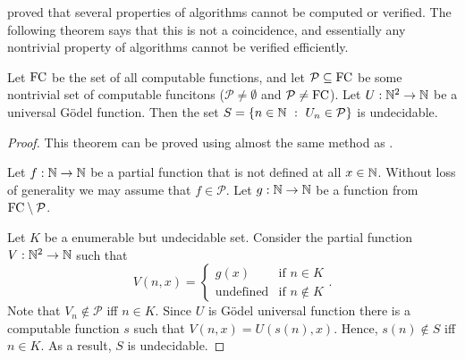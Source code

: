 proved that several properties of algorithms cannot be computed or verified.
The following theorem says that this is not a coincidence, and essentially any 
nontrivial property of algorithms cannot be verified efficiently.
\begin{theorem}
  Let $\mathrm{FC}$ be the set of all computable functions, and let
  $\mathcal{P} \subseteq \mathrm{FC}$ be some nontrivial set of computable
  funcitons ($\mathcal{P} \neq \emptyset$ and $\mathcal{P} \neq \mathrm{FC}$).
  Let $U : {\mathbb{N}}^2 \to {\mathbb{N}}$ be a universal G\"odel function. Then the set 
  $S = \set[U_n \in \mathcal{P}]{n \in \N}$ is undecidable.
\end{theorem}
\begin{proof}
  This theorem can be proved using almost the same method as
  .

  Let $f : {\mathbb{N}} \to {\mathbb{N}}$ be a partial function that is not defined at all $x \in
  {\mathbb{N}}$. Without loss of generality we may assume that $f \in \mathcal{P}$.
  Let $g : {\mathbb{N}} \to {\mathbb{N}}$ be a function from $\mathrm{FC} \setminus \mathcal{P}$.

  Let $K$ be a enumerable but undecidable set.
  Consider the partial function $V : {\mathbb{N}}^2 \to {\mathbb{N}}$ such that 
  \[
    V(n, x) = 
    \begin{cases}
      g(x) & \text{if } n \in K \\
      \text{undefined} & \text{if } n \not\in K 
    \end{cases}.
  \]
  Note that $V_n \not\in \mathcal{P}$ iff $n \in K$. 
  Since $U$ is G\"odel universal function there is a computable function $s$
  such that $V(n, x) = U(s(n), x)$. Hence, $s(n) \not\in S$ iff $n \in K$.
  As a result, $S$ is undecidable.
\end{proof}
